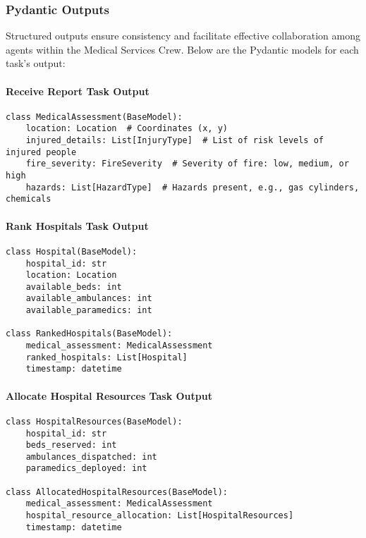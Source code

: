 \subsubsection{Pydantic Outputs}

Structured outputs ensure consistency and facilitate effective collaboration among agents within the Medical Services Crew. Below are the Pydantic models for each task's output:

\paragraph{Receive Report Task Output}
\begin{lstlisting}[caption={Pydantic model for Receive Report Task Output}]
class MedicalAssessment(BaseModel):
    location: Location  # Coordinates (x, y)
    injured_details: List[InjuryType]  # List of risk levels of injured people
    fire_severity: FireSeverity  # Severity of fire: low, medium, or high
    hazards: List[HazardType]  # Hazards present, e.g., gas cylinders, chemicals
\end{lstlisting}

\paragraph{Rank Hospitals Task Output}
\begin{lstlisting}[caption={Pydantic model for Rank Hospitals Task Output}]
class Hospital(BaseModel):
    hospital_id: str
    location: Location
    available_beds: int
    available_ambulances: int
    available_paramedics: int

class RankedHospitals(BaseModel):
    medical_assessment: MedicalAssessment
    ranked_hospitals: List[Hospital]
    timestamp: datetime
\end{lstlisting}

\paragraph{Allocate Hospital Resources Task Output}
\begin{lstlisting}[caption={Pydantic model for Allocate Hospital Resources Task Output}]
class HospitalResources(BaseModel):
    hospital_id: str
    beds_reserved: int
    ambulances_dispatched: int
    paramedics_deployed: int

class AllocatedHospitalResources(BaseModel):
    medical_assessment: MedicalAssessment
    hospital_resource_allocation: List[HospitalResources]
    timestamp: datetime
\end{lstlisting}

